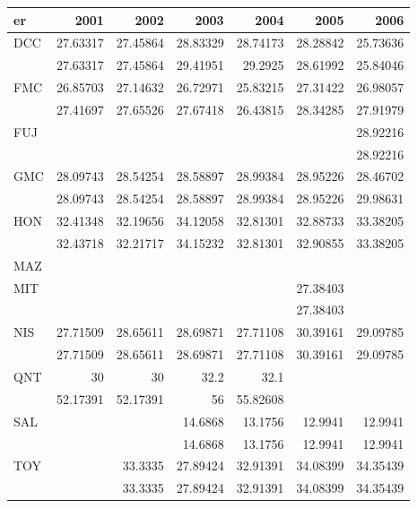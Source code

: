\begin{tabular}{lrrrrrr}
\toprule
er & 2001 & 2002 & 2003 & 2004 & 2005 & 2006 \\
\midrule
DCC & 27.63317 & 27.45864 & 28.83329 & 28.74173 & 28.28842 & 25.73636 \\
 & 27.63317 & 27.45864 & 29.41951 & 29.2925 & 28.61992 & 25.84046 \\
FMC & 26.85703 & 27.14632 & 26.72971 & 25.83215 & 27.31422 & 26.98057 \\
 & 27.41697 & 27.65526 & 27.67418 & 26.43815 & 28.34285 & 27.91979 \\
FUJ &  &  &  &  &  & 28.92216 \\
 &  &  &  &  &  & 28.92216 \\
GMC & 28.09743 & 28.54254 & 28.58897 & 28.99384 & 28.95226 & 28.46702 \\
 & 28.09743 & 28.54254 & 28.58897 & 28.99384 & 28.95226 & 29.98631 \\
HON & 32.41348 & 32.19656 & 34.12058 & 32.81301 & 32.88733 & 33.38205 \\
 & 32.43718 & 32.21717 & 34.15232 & 32.81301 & 32.90855 & 33.38205 \\
MAZ &  &  &  &  &  &  \\
MIT &  &  &  &  & 27.38403 &  \\
 &  &  &  &  & 27.38403 &  \\
NIS & 27.71509 & 28.65611 & 28.69871 & 27.71108 & 30.39161 & 29.09785 \\
 & 27.71509 & 28.65611 & 28.69871 & 27.71108 & 30.39161 & 29.09785 \\
QNT & 30 & 30 & 32.2 & 32.1 &  &  \\
 & 52.17391 & 52.17391 & 56 & 55.82608 &  &  \\
SAL &  &  & 14.6868 & 13.1756 & 12.9941 & 12.9941 \\
 &  &  & 14.6868 & 13.1756 & 12.9941 & 12.9941 \\
TOY &  & 33.3335 & 27.89424 & 32.91391 & 34.08399 & 34.35439 \\
 &  & 33.3335 & 27.89424 & 32.91391 & 34.08399 & 34.35439 \\
\bottomrule
\end{tabular}

